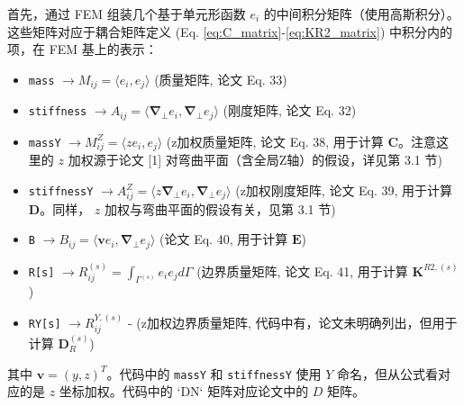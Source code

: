 \documentclass{ctexart}
\begin{document}
首先，通过 FEM 组装几个基于单元形函数 $e_i$ 的中间积分矩阵（使用高斯积分）。这些矩阵对应于耦合矩阵定义 (Eq. \eqref{eq:C_matrix}-\eqref{eq:KR2_matrix}) 中积分内的项，在 FEM 基上的表示：
\begin{itemize}
    \item \texttt{mass} $\rightarrow M_{ij} = \langle e_i, e_j \rangle$ (质量矩阵, 论文 Eq. 33)
    \item \texttt{stiffness} $\rightarrow A_{ij} = \langle \boldsymbol{\nabla}_\perp e_i, \boldsymbol{\nabla}_\perp e_j \rangle$ (刚度矩阵, 论文 Eq. 32)
    \item \texttt{massY} $\rightarrow M^Z_{ij} = \langle z e_i, e_j \rangle$ (z加权质量矩阵, 论文 Eq. 38, 用于计算 $\mathbf{C}$。注意这里的 $z$ 加权源于论文 [1] 对弯曲平面（含全局Z轴）的假设，详见第 3.1 节)
    \item \texttt{stiffnessY} $\rightarrow A^Z_{ij} = \langle z \boldsymbol{\nabla}_\perp e_i, \boldsymbol{\nabla}_\perp e_j \rangle$ (z加权刚度矩阵, 论文 Eq. 39, 用于计算 $\mathbf{D}$。同样， $z$ 加权与弯曲平面的假设有关，见第 3.1 节)
    \item \texttt{B} $\rightarrow B_{ij} = \langle \mathbf{v} e_i, \boldsymbol{\nabla}_\perp e_j \rangle$ (论文 Eq. 40, 用于计算 $\mathbf{E}$)
    \item \texttt{R[s]} $\rightarrow R^{(s)}_{ij} = \int_{\Gamma^{(s)}} e_i e_j d\Gamma$ (边界质量矩阵, 论文 Eq. 41, 用于计算 $\mathbf{K}^{R2, (s)}$)
    \item \texttt{RY[s]} $\rightarrow R^{Y,(s)}_{ij}$ - (z加权边界质量矩阵, 代码中有，论文未明确列出，但用于计算 $\mathbf{D}_R^{(s)}$)
\end{itemize}
其中 $\mathbf{v} = (y,z)^T$。代码中的 \texttt{massY} 和 \texttt{stiffnessY} 使用 $Y$ 命名，但从公式看对应的是 $z$ 坐标加权。代码中的 `DN` 矩阵对应论文中的 $D$ 矩阵。
\end{document}
